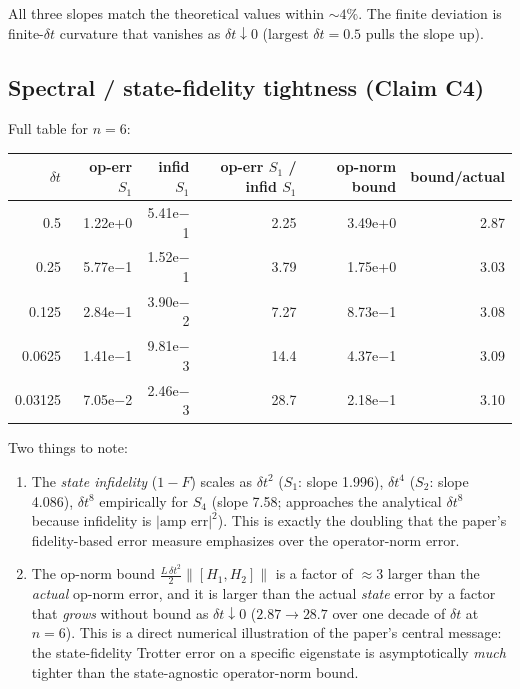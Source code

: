 \documentclass[11pt]{article}
\begin{document}
All three slopes match the theoretical values within $\sim 4\%$. The
finite deviation is finite-$\delta t$ curvature that vanishes as $\delta t\!\downarrow\!0$
(largest $\delta t=0.5$ pulls the slope up).

\subsection{Spectral / state-fidelity tightness (Claim C4)}

Full table for $n=6$:
\begin{center}
\begin{tabular}{@{}rrrrrr@{}}
\toprule
$\delta t$ & op-err $S_1$ & infid $S_1$ & op-err $S_1$ / infid $S_1$ & op-norm bound & bound/actual \\
\midrule
0.5     & 1.22e+0 & 5.41e$-$1 & 2.25 & 3.49e+0 & 2.87 \\
0.25    & 5.77e$-$1 & 1.52e$-$1 & 3.79 & 1.75e+0 & 3.03 \\
0.125   & 2.84e$-$1 & 3.90e$-$2 & 7.27 & 8.73e$-$1 & 3.08 \\
0.0625  & 1.41e$-$1 & 9.81e$-$3 & 14.4 & 4.37e$-$1 & 3.09 \\
0.03125 & 7.05e$-$2 & 2.46e$-$3 & 28.7 & 2.18e$-$1 & 3.10 \\
\bottomrule
\end{tabular}
\end{center}

Two things to note:
\begin{enumerate}
  \item The \emph{state infidelity} ($1-F$) scales as $\delta t^{2}$ ($S_1$: slope 1.996),
        $\delta t^{4}$ ($S_2$: slope 4.086), $\delta t^{8}$ empirically for $S_4$
        (slope 7.58; approaches the analytical $\delta t^{8}$ because infidelity is
        $|\text{amp err}|^2$). This is exactly the doubling that the paper's
        fidelity-based error measure emphasizes over the operator-norm error.
  \item The op-norm bound $\tfrac{L\,\delta t^{2}}{2}\|[H_1,H_2]\|$ is a factor
        of $\approx 3$ larger than the \emph{actual} op-norm error, and it is
        larger than the actual \emph{state} error by a factor that \emph{grows}
        without bound as $\delta t\!\downarrow\!0$ ($2.87\to 28.7$ over one decade of
        $\delta t$ at $n=6$). This is a direct numerical illustration of the
        paper's central message: the state-fidelity Trotter error on a specific
        eigenstate is asymptotically \emph{much} tighter than the state-agnostic
        operator-norm bound.
\end{enumerate}
\end{document}
